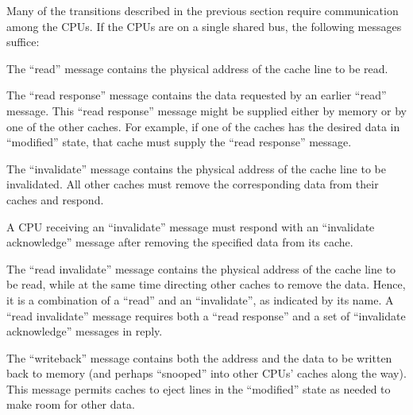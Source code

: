 Many of the transitions described in the previous section require
communication among the CPUs.
If the CPUs are on a single shared bus, the following messages suffice:
\begin{description}[style=nextline]
\item	[Read:]
	The ``read'' message contains the physical address of the cache line
	to be read.
\item	[Read Response:]
	The ``read response'' message contains the data requested by an
	earlier ``read'' message.
	This ``read response'' message might be supplied either by
	memory or by one of the other caches.
	For example, if one of the caches has the desired data in
	``modified'' state, that cache must supply the ``read response''
	message.
\item	[Invalidate:]
	The ``invalidate'' message contains the physical address of the
	cache line to be invalidated.
	All other caches must remove the corresponding data from their
	caches and respond.
\item	[Invalidate Acknowledge:]
	A CPU receiving an ``invalidate'' message must respond with an
	``invalidate acknowledge'' message after removing the specified
	data from its cache.
\item	[Read Invalidate:]
	The ``read invalidate'' message contains the physical address
	of the cache line to be read, while at the same time directing
	other caches to remove the data.
	Hence, it is a combination of a ``read'' and an ``invalidate'',
	as indicated by its name.
	A ``read invalidate'' message requires both a ``read response''
	and a set of ``invalidate acknowledge'' messages in reply.
\item	[Writeback:]
	The ``writeback'' message contains both the address and the
	data to be written back to memory (and perhaps ``snooped''
	into other CPUs' caches along the way).
	This message permits caches to eject lines in the ``modified''
	state as needed to make room for other data.
\end{description}

